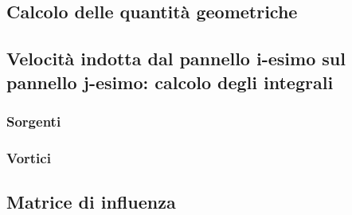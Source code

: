 \subsection{Calcolo delle quantità geometriche}

\subsection{Velocità indotta dal pannello i-esimo sul pannello j-esimo: calcolo degli integrali}

\subsubsection{Sorgenti}

\subsubsection{Vortici}

\subsection{Matrice di influenza}
